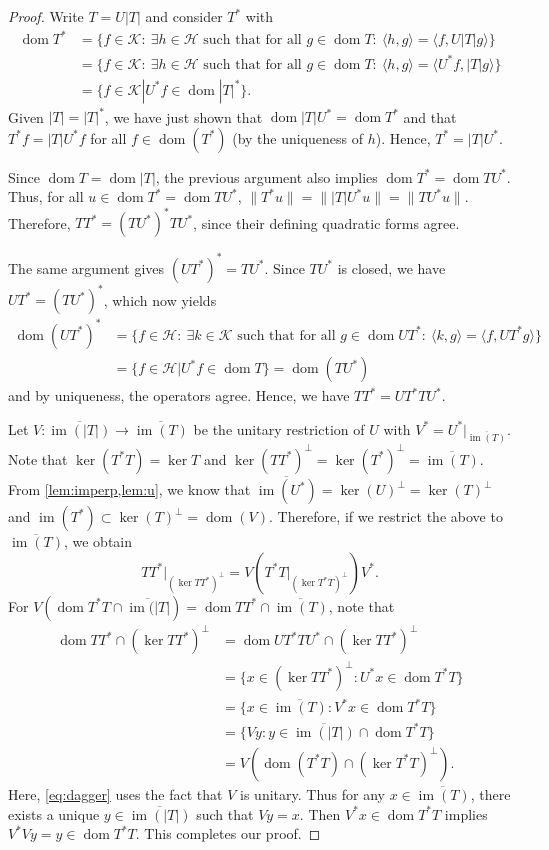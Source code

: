 \documentclass[11pt]{article}
\theoremstyle{definition}
\theoremstyle{remark}
\DeclareMathOperator\dom{dom}
\DeclareMathOperator{\im}{im}
\newcommand{\Hh}{\mathcal{H}}
\begin{document}
\begin{proof}
    Write $T=U|T|$ and consider $T^*$ with
    \begin{align*}
    \dom T^*&=\{ f\in \mathcal{K}:\ \exists h \in \mathcal{H} \text{ such that for all } g\in \dom T : \ \langle h,g\rangle=\langle f,U|T|g\rangle\}\\
    &=\{ f\in \mathcal{K}:\ \exists h \in \mathcal{H} \text{ such that for all } g\in \dom T: \ \langle h,g\rangle=\langle U^*f,|T|g\rangle\}\\
    &=\{f\in \mathcal{K}|U^*f\in\dom |T|^*\}.
\end{align*}
    Given $|T|=|T|^*$, we have just shown that $\dom |T|U^*=\dom T^*$ and that $T^*f=|T|U^*f$ for all $f \in \dom(T^*)$ (by the uniqueness of $h$). Hence, $T^*=|T|U^*$.
    
    Since $\dom T=\dom |T|$, the previous argument also implies $\dom T^*=\dom TU^*$.
    Thus, for all $u\in \dom T^*=\dom TU^*$,
    $\|T^*u\|=\||T|U^*u\|=\|TU^*u\|.$
    Therefore, $TT^*=(TU^*)^*TU^*$, since their defining quadratic forms agree.
    
    The same argument gives $(UT^*)^*=TU^*$. Since $TU^*$ is closed, we have $UT^*=(TU^*)^*$, which now yields
    \begin{align*}
    \dom (UT^*)^*&=\{ f\in \Hh:\ \exists k \in \mathcal{K} \text{ such that for all } g\in \dom UT^* : \ \langle k,g\rangle=\langle f,UT^* g\rangle\}\\
    &=\{f\in \mathcal{H}|U^*f\in\dom T\}=\dom(TU^*)
\end{align*}
    and by uniqueness, the operators agree. Hence, we have
    $TT^*=UT^*TU^*.$
    
    Let $V:\overline{\im(|T|)} \to \overline{\im(T)}$ be the unitary restriction of $U$ with $V^*=U^*|_{\overline{\im(T)}}$. Note that $\ker(T^*T)=\ker T$ and $\ker(TT^*)^\perp=\ker (T^*)^\perp=\overline{\im (T)}$. From \cref{lem:imperp,lem:u}, we know that $\overline{\im(U^*)}=\ker(U)^\perp=\ker(T)^\perp$ and $\im(T^*)\subset \ker(T)^\perp =\dom(V)$.
    Therefore, if we restrict the above to $\overline{\im(T)}$, we obtain
    $$
    TT^*|_{(\ker TT^*)^\perp}=V(T^*T|_{(\ker T^*T)^\perp})V^*.
    $$
    For $V(\dom T^*T\cap \overline{\im(|T|})=\dom TT^*\cap\overline{\im(T)}$, note that
    \begin{align*}
        \dom TT^*\cap(\ker TT^*)^\perp&=\dom UT^*TU^*\cap(\ker TT^*)^\perp\\
        &=\{x\in(\ker TT^*)^\perp:U^*x\in\dom T^*T\}\\
        &=\{x\in\overline{\im(T)}:V^*x\in\dom T^*T\}\\
        &=\{Vy:y\in\overline{\im(|T|)}\cap \dom T^*T\}\tag{$\dagger$}\label{eq:dagger}\\
        &=V(\dom(T^*T)\cap(\ker T^*T)^\perp).
    \end{align*}
    Here, \eqref{eq:dagger} uses the fact that $V$ is unitary. Thus for any $x\in\overline{\im(T)}$, there exists a unique $y\in\overline{\im(|T|)}$ such that $Vy=x$. Then $V^*x\in \dom T^*T$ implies $V^*Vy=y\in \dom T^*T$. This completes our proof.
\end{proof}
\end{document}
